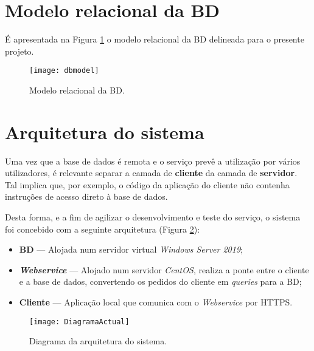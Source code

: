 \section{Modelo relacional da \acl{BD}}
\label{sec::engsoft:db}

É apresentada na Figura \ref{fig::diagrama-db} o modelo relacional da \acl{BD} delineada para o presente projeto.

\begin{figure}[!htbp]
    \centering
    \texttt{[image: dbmodel]}
    \caption[Modelo relacional]{Modelo relacional da \acl{BD}.}
    \label{fig::diagrama-db}
\end{figure}



\section{Arquitetura do sistema}
\label{sec::engsoft:arquitetura-sistema}

Uma vez que a base de dados é remota e o serviço prevê a utilização por vários utilizadores, é relevante separar a camada de \textbf{cliente} da camada de \textbf{servidor}. Tal implica que, por exemplo, o código da aplicação do cliente não contenha instruções de acesso direto à base de dados.

Desta forma, e a fim de agilizar o desenvolvimento e teste do serviço, o sistema foi concebido com a seguinte arquitetura (Figura \ref{fig::diagrama-sistema}):
\begin{itemize}
    \item \textbf{\acl{BD}} --- Alojada num servidor virtual \textit{Windows Server 2019};
    \item \textbf{\itshape Webservice} --- Alojado num servidor \textit{CentOS}, realiza a ponte entre o cliente e a base de dados, convertendo os pedidos do cliente em \textit{queries} para a \ac{BD};
    \item \textbf{Cliente} --- Aplicação local que comunica com o \textit{Webservice} por \ac{HTTPS}.
\end{itemize}



\begin{figure}[!htbp]
    \centering
    \texttt{[image: DiagramaActual]}
    \caption[Diagrama da arquitetura do sistema]{Diagrama da arquitetura do sistema.}
    \label{fig::diagrama-sistema}
\end{figure}

